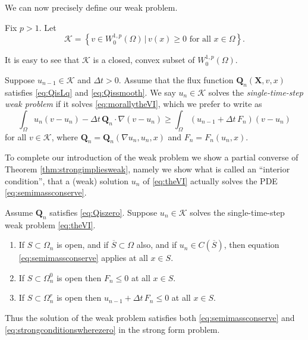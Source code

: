 \documentclass[final,leqno,onefignum,onetabnum]{siamltex1213bueler}
\newcommand\bQ{\mathbf{Q}}
\newcommand\bX{\mathbf{X}}
\renewcommand{\grad}{\nabla}
\begin{document}
\medskip
We can now precisely define our weak problem.

\medskip
\begin{definition}  Fix $p>1$.  Let
    $$\mathcal{K} = \left\{v \in W_0^{1,p}(\Omega) \,\big|\, v(x) \ge 0 \text{ for all } x \in \Omega\right\}.$$
\end{definition}
It is easy to see that $\mathcal{K}$ is a closed, convex subset of $W_0^{1,p}(\Omega)$.  

\medskip
\begin{definition}  Suppose $u_{n-1}\in\mathcal{K}$ and $\Delta t>0$.  Assume that the flux function $\bQ_n(\bX,v,x)$ satisfies \eqref{eq:QisLq} and \eqref{eq:Qissmooth}.  We say $u_n \in \mathcal{K}$ solves the \emph{single-time-step weak problem} if it solves \eqref{eq:morallytheVI}, which we prefer to write as
\begin{equation}
\int_{\Omega} u_n (v-u_n) - \Delta t\, \bQ_n \cdot \grad(v-u_n) \ge \int_{\Omega} \left(u_{n-1} + \Delta t\, F_n\right) (v-u_n)  \label{eq:theVI}
\end{equation}
for all $v \in \mathcal{K}$, where $\bQ_n=\bQ_n(\grad u_n,u_n,x)$ and $F_n = F_n(u_n,x)$.
\end{definition}

\medskip
To complete our introduction of the weak problem we show a partial converse of Theorem \ref{thm:strongimpliesweak}, namely we show what is called an ``interior condition'', that a (weak) solution $u_n$ of \eqref{eq:theVI} actually solves the PDE \eqref{eq:semimassconserve}.

\medskip
\begin{theorem} \label{thm:weakimpliesstrong}  Assume $\bQ_n$ satisfies \eqref{eq:Qiszero}.  Suppose $u_n\in\mathcal{K}$ solves the single-time-step weak problem \eqref{eq:theVI}.
\renewcommand{\labelenumi}{\emph{(\roman{enumi})}}
\begin{enumerate}
\item If $S \subset \Omega_n$ is open, and if $\overline{S}\subset \Omega$ also, and if $u_n\in C(\overline{S})$, then equation \eqref{eq:semimassconserve} applies at all $x\in S$.
\item If $S \subset \Omega_n^0$ is open then $F_n \le 0$ at all $x\in S$.
\item If $S \subset \Omega_n^r$ is open then $u_{n-1} + \Delta t\,F_n \le 0$ at all $x\in S$.
\end{enumerate}
Thus the solution of the weak problem satisfies both \eqref{eq:semimassconserve} and \eqref{eq:strongconditionswherezero} in the strong form problem.
\end{theorem}
\end{document}
